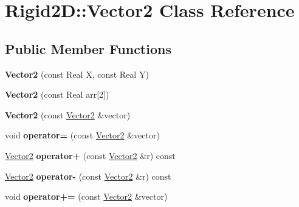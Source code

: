 \hypertarget{class_rigid2_d_1_1_vector2}{
\section{Rigid2D::Vector2 Class Reference}
\label{class_rigid2_d_1_1_vector2}
}
\subsection*{Public Member Functions}
\begin{DoxyCompactItemize}
\item 
\hypertarget{class_rigid2_d_1_1_vector2_ad4e74154287cd5ef31c0071ceef6ad95}{
{\bfseries Vector2} (const Real X, const Real Y)}
\label{class_rigid2_d_1_1_vector2_ad4e74154287cd5ef31c0071ceef6ad95}

\item 
\hypertarget{class_rigid2_d_1_1_vector2_a8161905c98da5d9d27c045d228ba4ed2}{
{\bfseries Vector2} (const Real arr\mbox{[}2\mbox{]})}
\label{class_rigid2_d_1_1_vector2_a8161905c98da5d9d27c045d228ba4ed2}

\item 
\hypertarget{class_rigid2_d_1_1_vector2_a5c513bb29573c7ec337da967cfb8147a}{
{\bfseries Vector2} (const \hyperlink{class_rigid2_d_1_1_vector2}{Vector2} \&vector)}
\label{class_rigid2_d_1_1_vector2_a5c513bb29573c7ec337da967cfb8147a}

\item 
\hypertarget{class_rigid2_d_1_1_vector2_a1f31d7817a9cd5b326ea9979aaec5d28}{
void {\bfseries operator=} (const \hyperlink{class_rigid2_d_1_1_vector2}{Vector2} \&vector)}
\label{class_rigid2_d_1_1_vector2_a1f31d7817a9cd5b326ea9979aaec5d28}

\item 
\hypertarget{class_rigid2_d_1_1_vector2_ab35018e8b3e4a0e71eda3cf222b01995}{
\hyperlink{class_rigid2_d_1_1_vector2}{Vector2} {\bfseries operator+} (const \hyperlink{class_rigid2_d_1_1_vector2}{Vector2} \&r) const }
\label{class_rigid2_d_1_1_vector2_ab35018e8b3e4a0e71eda3cf222b01995}

\item 
\hypertarget{class_rigid2_d_1_1_vector2_a0eb11121a0a4c03c5164647692d23c8c}{
\hyperlink{class_rigid2_d_1_1_vector2}{Vector2} {\bfseries operator-\/} (const \hyperlink{class_rigid2_d_1_1_vector2}{Vector2} \&r) const }
\label{class_rigid2_d_1_1_vector2_a0eb11121a0a4c03c5164647692d23c8c}

\item 
\hypertarget{class_rigid2_d_1_1_vector2_af020a543f09be6a2866bfce5271275a8}{
void {\bfseries operator+=} (const \hyperlink{class_rigid2_d_1_1_vector2}{Vector2} \&vector)}
\label{class_rigid2_d_1_1_vector2_af020a543f09be6a2866bfce5271275a8}


\end{DoxyCompactItemize}
